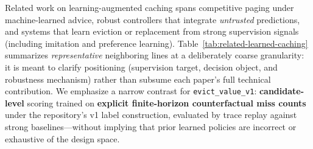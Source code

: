 Related work on learning-augmented caching spans competitive paging under machine-learned advice, robust controllers that integrate \emph{untrusted} predictions, and systems that learn eviction or replacement from strong supervision signals (including imitation and preference learning).
Table~\ref{tab:related-learned-caching} summarizes \emph{representative} neighboring lines at a deliberately coarse granularity: it is meant to clarify positioning (supervision target, decision object, and robustness mechanism) rather than subsume each paper's full technical contribution.
We emphasize a narrow contrast for \texttt{evict\_value\_v1}: \textbf{candidate-level} scoring trained on \textbf{explicit finite-horizon counterfactual miss counts} under the repository's v1 label construction, evaluated by trace replay against strong baselines---without implying that prior learned policies are incorrect or exhaustive of the design space.
